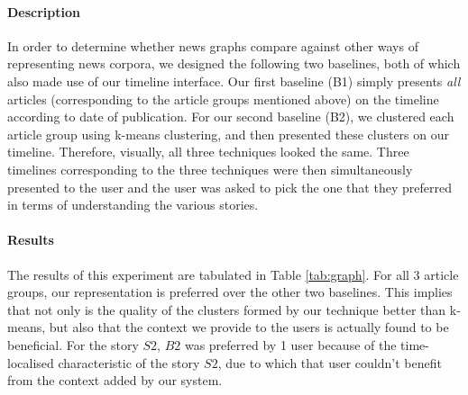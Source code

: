 \normalsize

\paragraph*{Description} In order to determine whether news graphs compare against other ways of representing news corpora, we designed the following two baselines, both of which also made use of our timeline interface. Our first baseline (B1) simply presents \emph{all} articles (corresponding to the article groups mentioned above) on the timeline according to date of publication. For our second baseline (B2), we clustered each article group using k-means clustering, and then presented these clusters on our timeline. Therefore, visually, all three techniques looked the same. Three timelines corresponding to the three techniques were then simultaneously presented to the user and the user was asked to pick the one that they preferred in terms of understanding the various stories.

\paragraph*{Results} The results of this experiment are tabulated in Table \ref{tab:graph}. For all 3 article groups, our representation is preferred over the other two baselines. This implies that not only is the quality of the clusters formed by our technique better than k-means, but also that the context we provide to the users is actually found to be beneficial. For the story $S2$, $B2$ was preferred by 1 user because of the time-localised characteristic of the story $S2$, due to which that user couldn't benefit from the context added by our system.



